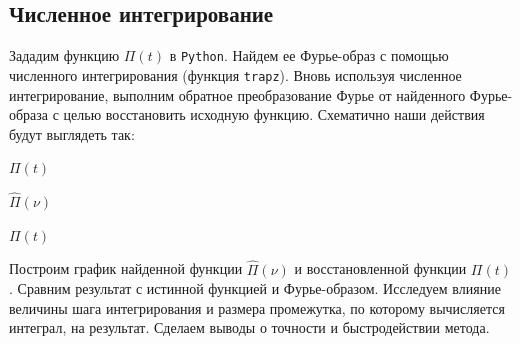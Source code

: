 \documentclass[a4paper, 12pt]{article}
\begin{document}
    \subsection{Численное интегрирование}
    Зададим функцию $\Pi(t)$ в \texttt{Python}. Найдем ее Фурье-образ с помощью численного интегрирования (функция \texttt{trapz}).
    Вновь используя численное интегрирование, выполним обратное преобразование Фурье от найденного Фурье-образа с целью восстановить исходную функцию.
    Схематично наши действия будут выглядеть так:
    \begin{center}
        $\Pi(t)$
        $\hat{\Pi}(\nu)$
        $\Pi(t)$
    \end{center}
    Построим график найденной функции $\hat{\Pi}(\nu)$ и восстановленной функции $\Pi(t)$.
    Сравним результат с истинной функцией и Фурье-образом. Исследуем влияние
    величины шага интегрирования и размера промежутка, по которому вычисляется
    интеграл, на результат. Сделаем выводы о точности и быстродействии метода.
\end{document}
